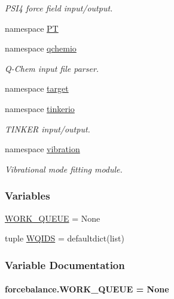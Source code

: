 \begin{DoxyCompactItemize}
\begin{DoxyCompactList}\small\item\em P\-S\-I4 force field input/output. \end{DoxyCompactList}\item 
namespace \hyperlink{namespaceforcebalance_1_1PT}{P\-T}
\item 
namespace \hyperlink{namespaceforcebalance_1_1qchemio}{qchemio}
\begin{DoxyCompactList}\small\item\em Q-\/\-Chem input file parser. \end{DoxyCompactList}\item 
namespace \hyperlink{namespaceforcebalance_1_1target}{target}
\item 
namespace \hyperlink{namespaceforcebalance_1_1tinkerio}{tinkerio}
\begin{DoxyCompactList}\small\item\em T\-I\-N\-K\-E\-R input/output. \end{DoxyCompactList}\item 
namespace \hyperlink{namespaceforcebalance_1_1vibration}{vibration}
\begin{DoxyCompactList}\small\item\em Vibrational mode fitting module. \end{DoxyCompactList}\end{DoxyCompactItemize}
\subsubsection*{Variables}
\begin{DoxyCompactItemize}
\item 
\hyperlink{namespaceforcebalance_a730d54f7aa4e228b2475e31765b36b68}{W\-O\-R\-K\-\_\-\-Q\-U\-E\-U\-E} = None
\item 
tuple \hyperlink{namespaceforcebalance_a582a602e14175af1441d1ec96fe9a75a}{W\-Q\-I\-D\-S} = defaultdict(list)
\end{DoxyCompactItemize}


\subsubsection{Variable Documentation}
\hypertarget{namespaceforcebalance_a730d54f7aa4e228b2475e31765b36b68}{
\paragraph[{W\-O\-R\-K\-\_\-\-Q\-U\-E\-U\-E}]{\setlength{\rightskip}{0pt plus 5cm}forcebalance.\-W\-O\-R\-K\-\_\-\-Q\-U\-E\-U\-E = None}}\label{namespaceforcebalance_a730d54f7aa4e228b2475e31765b36b68}


